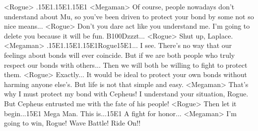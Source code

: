 <Rogue> .{15}{E1}.{15}{E1}.{15}{E1} 
<Megaman> Of course, people nowadays don't understand about Mu, 
so you've been driven to protect your bond by some not so nice means... 
<Rogue> Don't you dare act like you understand me. 
I'm going to delete you because it will be fun. 
{B1}{00}Dzzzt... 
<Rogue> Shut up, Laplace. 
<Megaman> .{15}{E1}.{15}{E1}.{15}{E1}Rogue{15}{E1}... I see. 
There's no way that our feelings about bonds will ever coincide. 
But if we are both people who truly respect our bonds with others... 
Then we will both be willing to fight to protect them. 
<Rogue> Exactly... 
It would be ideal to protect your own bonds without harming anyone else's. 
But life is not that simple and easy. 
<Megaman> That's why I must protect my bond with Cepheus! 
I understand your situation, Rogue. But Cepheus 
entrusted me with the fate of his people! 
<Rogue> Then let it begin...{15}{E1} Mega Man. 
This is...{15}{E1} A fight for honor... 
<Megaman> I'm going to win, Rogue! 
Wave Battle! Ride On!! 
